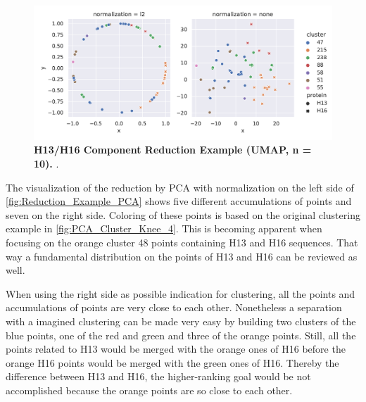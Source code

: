 \begin{figure}[!hbt]
    \centering
    \includegraphics[width=\textwidth]{UMAP/Difference_Segment_4_H_UMAP_Neighbors_10.pdf}
    \caption[H13/H16 Component Reduction Example (\Acrshort{UMAP}, n = 10)]{\textbf{H13/H16 Component Reduction Example (\Acrshort{UMAP}, n = 10).} .}
    \label{fig:Reduction_Example_UMAP_10}
\end{figure}

The visualization of the reduction by \gls{PCA} with normalization on the left side of \autoref{fig:Reduction_Example_PCA} shows five different accumulations of points and seven on the right side. Coloring of these points is based on the original clustering example in \autoref{fig:PCA_Cluster_Knee_4}. This is becoming apparent when focusing on the orange cluster 48 points containing H13 and H16 sequences. That way a fundamental distribution on the points of H13 and H16 can be reviewed as well. 

When using the right side as possible indication for clustering, all the points and accumulations of points are very close to each other. Nonetheless a separation with a imagined clustering can be made very easy by building two clusters of the blue points, one of the red and green and three of the orange points. Still, all the points related to H13 would be merged with the orange ones of H16 before the orange H16 points would be merged with the green ones of H16. Thereby the difference between H13 and H16, the higher-ranking goal would be not accomplished because the orange points are so close to each other. 

